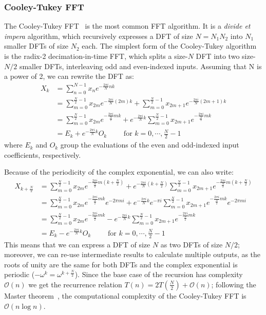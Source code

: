 \subsubsection{Cooley-Tukey FFT}
The Cooley-Tukey FFT~\cite{cooley1965algorithm} is the most common FFT algorithm. It is a \textit{divide et impera} algorithm, which recursively expresses a DFT of
size $N = N_1 N_2$ into $N_1$ smaller DFTs of size $N_2$ each. The simplest form of the Cooley-Tukey algorithm is the radix-2 decimation-in-time FFT, which 
splits a size-$N$ DFT into two size-$N/2$ smaller DFTs, interleaving odd and even-indexed inputs. 
Assuming that N is a power of 2, we can rewrite the DFT as:
\begin{align*}
    X_k & = \sum_{n=0}^{N-1} x_n e^{-\frac{2\pi i}{N}nk} \\
        & = \sum_{m=0}^{\frac{N}{2}-1}x_{2m}e^{-\frac{2\pi i}{N}(2m)k} + \sum_{m=0}^{\frac{N}{2}-1}x_{2m+1}e^{-\frac{2\pi i}{N}(2m+1)k} \\
        & = \sum_{m=0}^{\frac{N}{2}-1}x_{2m}e^{-\frac{2\pi i}{\frac{N}{2}}mk} + e^{-\frac{2\pi i}{N}k}\sum_{m=0}^{\frac{N}{2}-1}x_{2m+1}e^{-\frac{2\pi i}{\frac{N}{2}}mk} \\
        & = E_k + e^{-\frac{2\pi i}{N}k}O_k \qquad \text{ for } k = 0, \cdots, \frac{N}{2}-1
\end{align*}
where $E_k$ and $O_k$ group the evaluations of the even and odd-indexed input coefficients, respectively.

Because of the periodicity of the complex exponential, we can also write:
\begin{align*}
    X_{k+\frac{N}{2}} & = \sum_{m=0}^{\frac{N}{2}-1}x_{2m}e^{-\frac{2\pi i}{\frac{N}{2}}m(k+\frac{N}{2})} + e^{-\frac{2\pi i}{N}(k+\frac{N}{2})}\sum_{m=0}^{\frac{N}{2}-1}x_{2m+1}e^{-\frac{2\pi i}{\frac{N}{2}}m(k+\frac{N}{2})} \\
        & = \sum_{m=0}^{\frac{N}{2}-1}x_{2m}e^{-\frac{2\pi i}{\frac{N}{2}}mk}e^{-2\pi mi} + e^{-\frac{2\pi i}{N}k}e^{-\pi i}\sum_{m=0}^{\frac{N}{2}-1}x_{2m+1}e^{-\frac{2\pi i}{\frac{N}{2}}mk}e^{-2\pi mi} \\
        & = \sum_{m=0}^{\frac{N}{2}-1}x_{2m}e^{-\frac{2\pi i}{\frac{N}{2}}mk} - e^{-\frac{2\pi i}{N}k}\sum_{m=0}^{\frac{N}{2}-1}x_{2m+1}e^{-\frac{2\pi i}{\frac{N}{2}}mk} \\
        & = E_k - e^{-\frac{2\pi i}{N}k}O_k \qquad \text{ for } k = 0, \cdots, \frac{N}{2}-1
\end{align*}
This means that we can express a DFT of size $N$ as two DFTs of size $N/2$; moreover, we can re-use intermediate results to calculate multiple outputs,
as the roots of unity are the same for both DFTs and the complex exponential is periodic ($-\omega^k = \omega^{k+\frac{N}{2}}$). 
Since the base case of the recursion has complexity $\mathcal{O}(n)$ we get the recurrence relation $T(n) = 2T(\frac{N}{2}) + \mathcal{O}(n)$;
following the Master theorem~\cite{bentley1980general}, the computational complexity of the Cooley-Tukey FFT is $\mathcal{O}(n\log n)$.


